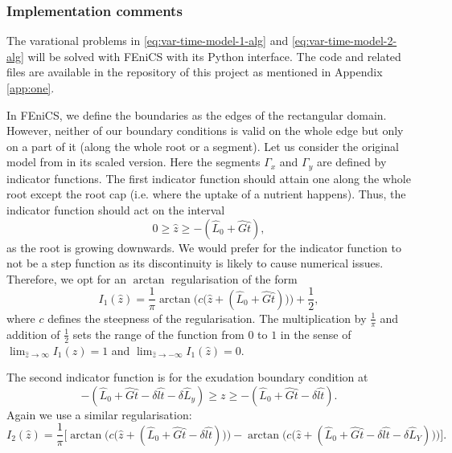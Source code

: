 \documentclass[11pt]{article}
\numberwithin{equation}{section}
\begin{document}
\subsubsection{Implementation comments}



The varational problems in \eqref{eq:var-time-model-1-alg} and \eqref{eq:var-time-model-2-alg} will be solved with FEniCS \cite{AlnaesBlechta2015a} with its Python interface. The code and related files are available in the repository of this project as mentioned in Appendix \ref{app:one}.


In FEniCS, we define the boundaries as the edges of the rectangular domain. However, neither of our boundary conditions is valid on the whole edge but only on a part of it (along the whole root or a segment).
Let us consider the original model from \cite{Ptashnyk-2011} in its scaled version. Here the segments \(\Gamma_x\) and \(\Gamma_y\) are defined by indicator functions. 
The first indicator function should attain one along the whole root except the root cap (i.e. where the uptake of a nutrient happens). Thus, the indicator function should act on the interval 
\[
    0 \geq \hat{z} \geq -(\hat{L}_0 + \hat{G} \hat{t} ),
\]
as the root is growing downwards. We would prefer for the indicator function to not be a step function as its discontinuity is likely to cause numerical issues. Therefore, we opt for an $\arctan$ regularisation of the form
\begin{equation}
    I_1 (\hat z) = \frac{1}{\pi} \arctan\Big(c \big(\hat z + (\hat L_0 + \hat G \hat t) \big) \Big) + \frac{1}{2},
\end{equation}
where $c$ defines the steepness of the regularisation. The multiplication by $\frac{1}{\pi}$ and addition of $\frac{1}{2}$ sets the range of the function from $0$ to $1$ in the sense of $\lim_{\hat z \to \infty} I_1(\hat z) = 1$ and $\lim_{\hat z \to -\infty} I_1(\hat z) = 0$.

The second indicator function is for the exudation boundary condition at 
\[
    -(\hat L_0 + \hat G \hat t - \delta \widehat{lt} - \delta \hat L_y) \geq z \geq -(\hat L_0 + \hat G \hat t - \delta \widehat{lt}).
\]
Again we use a similar regularisation:
\begin{equation}
    I_2 (\hat z) = \frac{1}{\pi} \bigg[ \arctan\Big(c \big(\hat z + (\hat L_0 + \hat G\hat t -\delta \widehat{lt}) \big) \Big) - \arctan\big(c \big( \hat z+(\hat L_0 + \hat G \hat t - \delta \widehat{lt} - \delta \hat L_Y ) \big) \Big) \bigg].
\end{equation}
\end{document}
